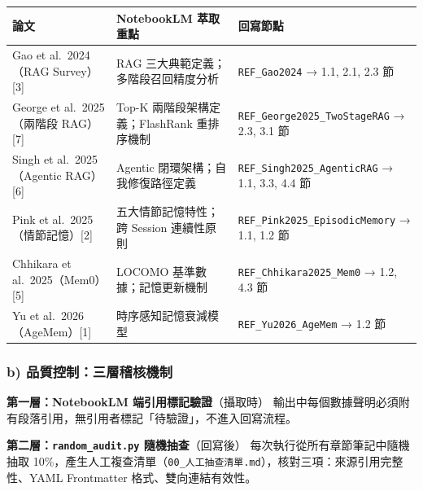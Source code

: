 {\def\LTcaptype{none} %
\begin{longtable}[]{@{}
  >{\raggedright\arraybackslash}p{}
  >{\raggedright\arraybackslash}p{}
  >{\raggedright\arraybackslash}p{}@{}}
\toprule\noalign{}
\begin{minipage}[b]{\linewidth}\raggedright
論文
\end{minipage} & \begin{minipage}[b]{\linewidth}\raggedright
NotebookLM 萃取重點
\end{minipage} & \begin{minipage}[b]{\linewidth}\raggedright
回寫節點
\end{minipage} \\
\midrule\noalign{}
\endhead
\bottomrule\noalign{}
\endlastfoot
Gao et al.~2024（RAG Survey）{[}3{]} & RAG
三大典範定義；多階段召回精度分析 & \texttt{REF\_Gao2024} → 1.1, 2.1, 2.3
節 \\
George et al.~2025（兩階段 RAG）{[}7{]} & Top-K
兩階段架構定義；FlashRank 重排序機制 &
\texttt{REF\_George2025\_TwoStageRAG} → 2.3, 3.1 節 \\
Singh et al.~2025（Agentic RAG）{[}6{]} & Agentic
閉環架構；自我修復路徑定義 & \texttt{REF\_Singh2025\_AgenticRAG} → 1.1,
3.3, 4.4 節 \\
Pink et al.~2025（情節記憶）{[}2{]} & 五大情節記憶特性；跨 Session
連續性原則 & \texttt{REF\_Pink2025\_EpisodicMemory} → 1.1, 1.2 節 \\
Chhikara et al.~2025（Mem0）{[}5{]} & LOCOMO 基準數據；記憶更新機制 &
\texttt{REF\_Chhikara2025\_Mem0} → 1.2, 4.3 節 \\
Yu et al.~2026（AgeMem）{[}1{]} & 時序感知記憶衰減模型 &
\texttt{REF\_Yu2026\_AgeMem} → 1.2 節 \\
\end{longtable}
}

\subsubsection{b)
品質控制：三層稽核機制}\label{b-ux54c1ux8ceaux63a7ux5236ux4e09ux5c64ux7a3dux6838ux6a5fux5236}

\textbf{第一層：NotebookLM 端引用標記驗證}（攝取時）
輸出中每個數據聲明必須附有段落引用，無引用者標記「待驗證」，不進入回寫流程。

\textbf{第二層：\texttt{random\_audit.py} 隨機抽查}（回寫後）
每次執行從所有章節筆記中隨機抽取
10\%，產生人工複查清單（\texttt{00\_人工抽查清單.md}），核對三項：來源引用完整性、YAML
Frontmatter 格式、雙向連結有效性。

